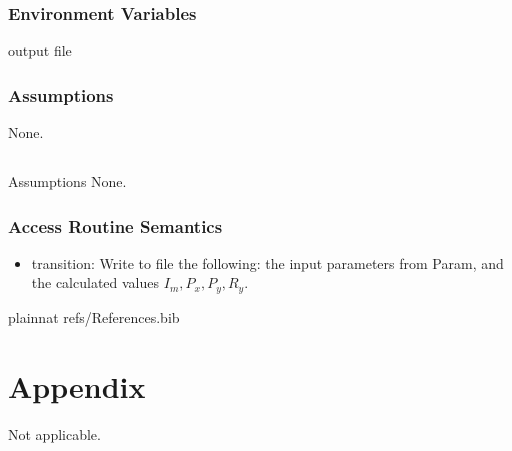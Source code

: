 \documentclass[12pt, titlepage]{article}
\begin{document}
\subsubsection{Environment Variables}
output file

\subsubsection{Assumptions}
None.

\subsection{}{Assumptions}
None.
\subsubsection{Access Routine Semantics}
\begin{itemize}
    \item transition: Write to file the following: the input 
parameters from Param, and the calculated values $I_m, P_x,P_y,R_y$. 

\end{itemize}


\newpage

 {plainnat}
 {refs/References.bib}

\newpage

\section{Appendix} \label{Appendix}

Not applicable.
\end{document}
